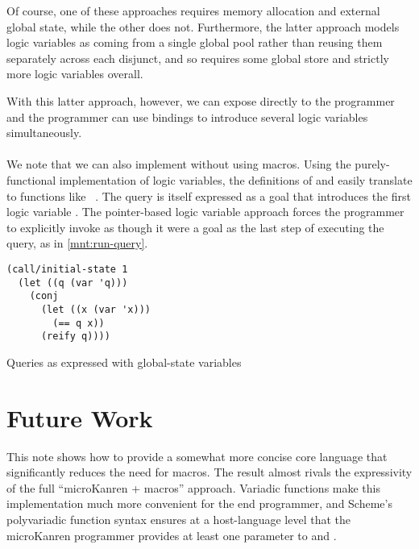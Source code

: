 \documentclass[sigplan,draft,balance,pbalance,natbib=false]{acmart}
\begin{document}
Of course, one of these approaches requires memory allocation and
external global state, while the other does not. Furthermore, the
latter approach models logic variables as coming from a single global
pool rather than reusing them separately across each disjunct, and so
requires some global store and strictly more logic variables overall.

With this latter approach, however, we can expose 
directly to the programmer and the programmer can use 
bindings to introduce several logic variables simultaneously.

\paragraph{}

We note that we can also implement  without using
macros. Using the purely-functional implementation of logic variables,
the definitions of  and  easily
translate to functions
like ~\cite{hemann2013muKanren}. The
query is itself expressed as a goal that introduces the first logic
variable . The pointer-based logic variable approach
forces the programmer to explicitly invoke  as
though it were a goal as the last step of executing the query, as in
\cref{mnt:run-query}.

\begin{listing}
  \begin{verbatim}
(call/initial-state 1
  (let ((q (var 'q)))
    (conj
      (let ((x (var 'x)))
        (== q x))
      (reify q))))
  \end{verbatim}
  \caption{Queries as expressed with global-state variables}
  \label{mnt:run-query}
\end{listing}

\section{Future Work}\label{sec:conclusion}

This note shows how to provide a somewhat more concise core language
that significantly reduces the need for macros. The result almost
rivals the expressivity of the full \enquote{microKanren + macros}
approach. Variadic functions make this implementation much more
convenient for the end programmer, and Scheme's polyvariadic function
syntax ensures at a host-language level that the microKanren
programmer provides at least one parameter to 
and .
\end{document}

